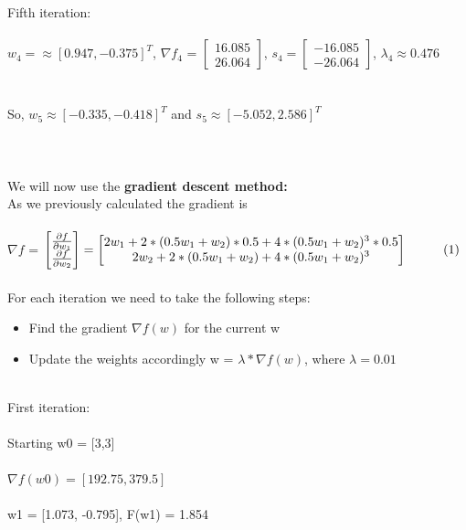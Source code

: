 \documentclass{article}
\begin{document}
\noindent Fifth iteration:\\\\ $w_4 = \approx [0.947, -0.375]^T$, \( \nabla f_4 \) = $ \begin{bmatrix} 
  16.085\\
  26.064 
\end{bmatrix}$, $ s_4 = \begin{bmatrix} 
  -16.085\\
  -26.064
\end{bmatrix}$, $\lambda_4 \approx 0.476$\\ \\ \\ So, $w_5 \approx [-0.335, -0.418]^T$ and $s_5 \approx [-5.052, 2.586]^T$ \\ \\ \\ \\


\noindent We will now use the \textbf{gradient descent method:} \\
As we previously calculated the gradient is\\ \\
\( \nabla f \) = $ \begin{bmatrix}
  \frac{\partial f}{\partial w_1} \\
  \frac{\partial f}{\partial w_2} 
\end{bmatrix} = \begin{bmatrix}
  2w_1 + 2*(0.5w_1+w_2)*0.5 +4*(0.5w_1+w_2)^3 * 0.5 \\
  2w_2 +2*(0.5w_1+w_2) +4*(0.5w_1+w_2)^3 
\end{bmatrix} \hspace*{1cm}(1)$ \\ \\

\noindent For each iteration we need to take the following steps:
\begin{itemize}
  \item Find the gradient $\nabla f(w)$ for the current w 
  \item Update the weights accordingly w = $\lambda * \nabla f(w)$, where $\lambda= 0.01$ \\ \\
\end{itemize}


\noindent First iteration: \\ \\
Starting w0 = [3,3] \\ \\
$\nabla f(w0)= [192.75 , 379.5]$ \\ \\
w1 = [1.073, -0.795], F(w1) = 1.854 \\ \\
\end{document}
